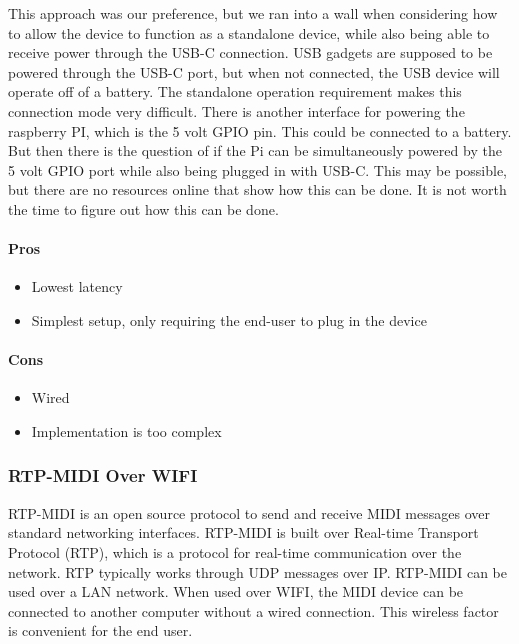 This approach was our preference, but we ran into a wall when considering how to allow the
device to function as a standalone device, while also being able to receive power through
the USB-C connection. USB gadgets are supposed to be powered through the USB-C port, but
when not connected, the USB device will operate off of a battery. The standalone operation
requirement makes this connection mode very difficult. There is another interface for
powering the raspberry PI, which is the 5 volt GPIO pin. This could be connected to a
battery. But then there is the question of if the Pi can be simultaneously powered by the
5 volt GPIO port while also being plugged in with USB-C. This may be possible, but there
are no resources online that show how this can be done. It is not worth the time to figure
out how this can be done.

\paragraph{Pros}

\begin{itemize}
  \item Lowest latency
  \item Simplest setup, only requiring the end-user to plug in the device
\end{itemize}

\paragraph{Cons}

\begin{itemize}
  \item Wired
  \item Implementation is too complex
\end{itemize}

\subsubsection{RTP-MIDI Over WIFI}

RTP-MIDI is an open source protocol to send and receive MIDI messages over standard
networking interfaces. RTP-MIDI is built over Real-time Transport Protocol (RTP), which is
a protocol for real-time communication over the network. RTP typically works through UDP
messages over IP. RTP-MIDI can be used over a LAN network. When used over WIFI, the MIDI
device can be connected to another computer without a wired connection. This wireless
factor is convenient for the end user.

